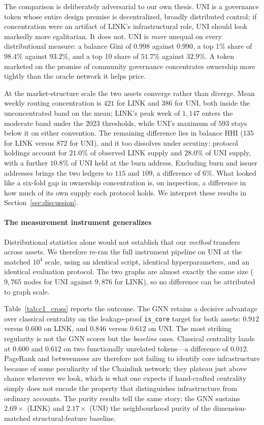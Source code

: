\documentclass[final,5p,times]{elsarticle}
\begin{document}
The comparison is deliberately adversarial to our own thesis. UNI is a
governance token whose entire design premise is decentralized, broadly
distributed control; if concentration were an artifact of LINK's
infrastructural role, UNI should look markedly more egalitarian. It does
not. UNI is \emph{more} unequal on every distributional measure: a balance
Gini of $0.998$ against $0.990$, a top 1\% share of $98.4\%$ against
$93.2\%$, and a top 10 share of $51.7\%$ against $32.9\%$. A token marketed
on the promise of community governance concentrates ownership more tightly
than the oracle network it helps price.

At the market-structure scale the two assets converge rather than diverge.
Mean weekly routing concentration is $421$ for LINK and $386$ for UNI, both
inside the unconcentrated band on the mean; LINK's peak week of $1{,}147$
enters the moderate band under the 2023 thresholds, while UNI's maximum of
$593$ stays below it on either convention. The remaining difference lies in balance HHI ($135$ for
LINK versus $872$ for UNI), and it too dissolves under scrutiny: protocol
holdings account for $21.0\%$ of observed LINK supply and $28.0\%$ of UNI
supply, with a further $10.8\%$ of UNI held at the burn address. Excluding
burn and issuer addresses brings the two ledgers to $115$ and $109$, a
difference of $6\%$. What looked like a six-fold gap in ownership
concentration is, on inspection, a difference in how much of its own supply
each protocol holds. We interpret these results in
Section~\ref{sec:discussion}.

\paragraph{The measurement instrument generalizes}
Distributional statistics alone would not establish that our \emph{method}
transfers across assets. We therefore re-ran the full instrument pipeline on UNI at
the matched $10^4$ scale, using an identical script, identical
hyperparameters, and an identical evaluation protocol. The two graphs are
almost exactly the same size ($9{,}765$ nodes for UNI against $9{,}876$ for
LINK), so no difference can be attributed to graph scale.

Table~\ref{tab:c1_cross} reports the outcome.
The GNN retains a decisive advantage over classical centrality on the
leakage-proof \texttt{is\_core} target for both assets: $0.912$ versus
$0.600$ on LINK, and $0.846$ versus $0.612$ on UNI. The most striking
regularity is not the GNN scores but the \emph{baseline} ones. Classical
centrality lands at $0.600$ and $0.612$ on two functionally unrelated
tokens---a difference of $0.012$. PageRank and betweenness are therefore
not failing to identify core infrastructure because of some peculiarity of
the Chainlink network; they plateau just above chance wherever we look,
which is what one expects if hand-crafted centrality simply does not encode
the property that distinguishes infrastructure from ordinary accounts. The
purity results tell the same story: the GNN sustains $2.69\times$ (LINK)
and $2.17\times$ (UNI) the neighbourhood purity of the dimension-matched
structural-feature baseline.
\end{document}
